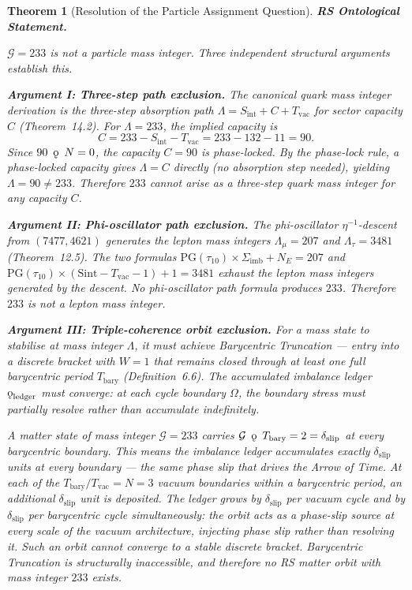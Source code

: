 \documentclass[11pt, letterpaper]{article}
\newcommand{\koppa}{\mathbin{\text{\rm\k{o}}}}
\theoremstyle{definition}
\theoremstyle{plain}
\newtheorem{theorem}{Theorem}[section]
\begin{document}
\begin{theorem}[Resolution of the Particle Assignment Question]

\textbf{RS Ontological Statement.}

$\mathcal{G} = 233$ is not a particle mass integer. Three independent structural
arguments establish this.

\medskip
\noindent\textbf{Argument I: Three-step path exclusion.}
The canonical quark mass integer derivation is the three-step absorption path
$\Lambda = S_\mathrm{int} + C + T_\mathrm{vac}$ for sector capacity $C$ (Theorem~14.2).
For $\Lambda = 233$, the implied capacity is
\[
    C = 233 - S_\mathrm{int} - T_\mathrm{vac} = 233 - 132 - 11 = 90.
\]
Since $90 \;\mathbin{\koppa}\; N = 0$, the capacity $C = 90$ is phase-locked. By the
phase-lock rule, a phase-locked capacity gives $\Lambda = C$ directly (no absorption
step needed), yielding $\Lambda = 90 \neq 233$. Therefore $233$ cannot arise as a
three-step quark mass integer for any capacity $C$.

\medskip
\noindent\textbf{Argument II: Phi-oscillator path exclusion.}
The phi-oscillator $\eta^{-1}$-descent from $(7477, 4621)$ generates the lepton mass
integers $\Lambda_\mu = 207$ and $\Lambda_\tau = 3481$ (Theorem~12.5). The two
formulas $\mathrm{PG}(\tau_{10}) \times \Sigma_\mathrm{imb} + N_E = 207$ and
$\mathrm{PG}(\tau_{10}) \times (\mathrm{Sint} - T_\mathrm{vac} - 1) + 1 = 3481$
exhaust the lepton mass integers generated by the descent. No phi-oscillator path
formula produces $233$. Therefore $233$ is not a lepton mass integer.

\medskip
\noindent\textbf{Argument III: Triple-coherence orbit exclusion.}
For a mass state to stabilise at mass integer $\Lambda$, it must achieve Barycentric
Truncation — entry into a discrete bracket with $W = 1$ that remains closed through
at least one full barycentric period $T_\mathrm{bary}$ (Definition~6.6). The
accumulated imbalance ledger $\koppa_\mathrm{ledger}$ must converge: at each cycle
boundary $\Omega$, the boundary stress must partially resolve rather than accumulate
indefinitely.

A matter state of mass integer $\mathcal{G} = 233$ carries $\mathcal{G}
\;\mathbin{\koppa}\; T_\mathrm{bary} = 2 = \delta_\mathrm{slip}$ at every barycentric
boundary. This means the imbalance ledger accumulates exactly $\delta_\mathrm{slip}$
units at every boundary — the same phase slip that drives the Arrow of Time. At each
of the $T_\mathrm{bary}/T_\mathrm{vac} = N = 3$ vacuum boundaries within a barycentric
period, an additional $\delta_\mathrm{slip}$ unit is deposited. The ledger grows by
$\delta_\mathrm{slip}$ per vacuum cycle and by $\delta_\mathrm{slip}$ per barycentric
cycle simultaneously: the orbit acts as a \emph{phase-slip source} at every scale of
the vacuum architecture, injecting phase slip rather than resolving it. Such an orbit
cannot converge to a stable discrete bracket. Barycentric Truncation is structurally
inaccessible, and therefore no RS matter orbit with mass integer $233$ exists.


\end{theorem}
\end{document}
